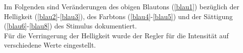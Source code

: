 \documentclass[11pt]{article}
\begin{document}
Im Folgenden sind Veränderungen des obigen Blautons (\ref{blau1}) bezüglich der Helligkeit (\ref{blau2}-\ref{blau3}), des Farbtons (\ref{blau4}-\ref{blau5}) und der Sättigung (\ref{blau6}-\ref{blau8}) des Stimulus dokumentiert. \\

Für die Verringerung der Helligkeit wurde der Regler für die Intensität auf verschiedene Werte eingestellt. 

\end{document}
